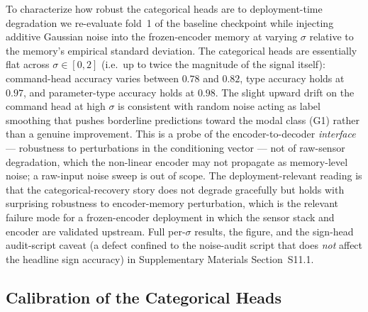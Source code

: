 \documentclass[sensors,article,submit,moreauthors,pdftex]{Definitions/mdpi}
\begin{document}
To characterize how robust the categorical heads are to deployment-time degradation we re-evaluate fold~1 of the baseline checkpoint while injecting additive Gaussian noise into the frozen-encoder memory at varying $\sigma$ relative to the memory's empirical standard deviation. The categorical heads are essentially flat across $\sigma \in [0, 2]$ (i.e.\ up to twice the magnitude of the signal itself): command-head accuracy varies between $0.78$ and $0.82$, type accuracy holds at $0.97$, and parameter-type accuracy holds at $0.98$. The slight upward drift on the command head at high $\sigma$ is consistent with random noise acting as label smoothing that pushes borderline predictions toward the modal class (G1) rather than a genuine improvement. This is a probe of the encoder-to-decoder \emph{interface} --- robustness to perturbations in the conditioning vector --- not of raw-sensor degradation, which the non-linear encoder may not propagate as memory-level noise; a raw-input noise sweep is out of scope. The deployment-relevant reading is that the categorical-recovery story does not degrade gracefully but holds with surprising robustness to encoder-memory perturbation, which is the relevant failure mode for a frozen-encoder deployment in which the sensor stack and encoder are validated upstream. Full per-$\sigma$ results, the figure, and the sign-head audit-script caveat (a defect confined to the noise-audit script that does \emph{not} affect the headline sign accuracy) in Supplementary Materials Section~S11.1.

\subsection{Calibration of the Categorical Heads}
\label{sec:calibration}
\end{document}
